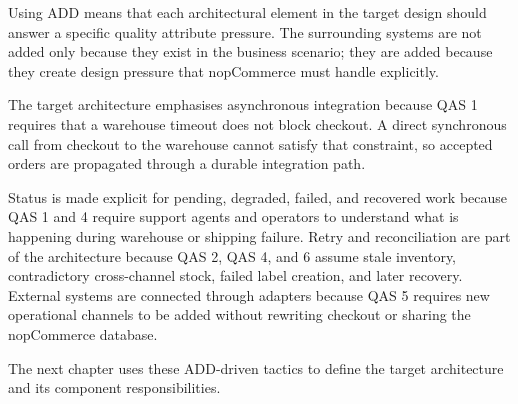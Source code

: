 Using ADD means that each architectural element in the target design should answer a specific
quality attribute pressure. The surrounding systems are not added only because they exist in the
business scenario; they are added because they create design pressure that nopCommerce must
handle explicitly.

The target architecture emphasises asynchronous integration because QAS 1 requires that a
warehouse timeout does not block checkout. A direct synchronous call from checkout to the
warehouse cannot satisfy that constraint, so accepted orders are propagated through a durable
integration path.

Status is made explicit for pending, degraded, failed, and recovered work because QAS 1
and 4 require support agents and operators to understand what is happening during warehouse or
shipping failure. Retry and reconciliation are part of the architecture because QAS 2, QAS 4,
and 6 assume stale inventory, contradictory cross-channel stock, failed label creation, and
later recovery. External systems are connected through adapters because QAS 5 requires new
operational channels to be added without rewriting checkout or sharing the nopCommerce database.

The next chapter uses these ADD-driven tactics to define the target architecture and its
component responsibilities.
